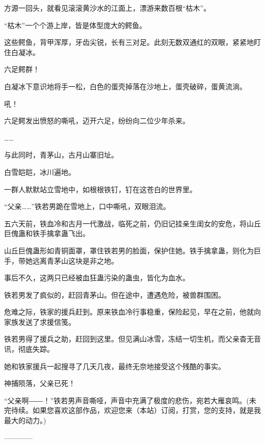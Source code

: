\begin{this_body}
方源一回头，就看见滚滚黄沙水的江面上，漂游来数百根“枯木”。

“枯木”一个个游上岸，皆是体型庞大的鳄鱼。

这些鳄鱼，背甲浑厚，牙齿尖锐，长有三对足。此刻无数双通红的双眼，紧紧地盯住白凝冰。

六足鳄群！

白凝冰下意识地将手一松，白色的蛋壳掉落在沙地上，蛋壳破碎，蛋黄流淌。

吼！

六足鳄发出愤怒的嘶吼，迈开六足，纷纷向二位少年杀来。

……

与此同时，青茅山，古月山寨旧址。

白雪皑皑，冰川遍地。

一群人默默站立雪地中，如根根铁钉，钉在这苍白的世界里。

“父亲……”铁若男跪在雪地上，口中嘶吼，双眼泪流。

五六天前，铁血冷和古月一代激战，临死之前，仍旧记挂亲生闺女的安危，将山丘巨傀蛊和铁手擒拿蛊飞出。

山丘巨傀蛊形如青铜面罩，罩住铁若男的脸面，保护住她。铁手擒拿蛊，则化为巨手，带她远离青茅山这块是非之地。

事后不久，这两只已经被血狂蛊污染的蛊虫，皆化为血水。

铁若男发了疯似的，赶回青茅山。但在途中，遭遇危险，被兽群围困。

危难之际，铁家的援兵赶到。原来铁血冷行事稳重，保险起见，早在之前，他就向家族发送了求援信笺。

铁若男得了援兵之助，赶回到这里。但见满山冰雪，冻结一切生机，而父亲杳无音讯，彻底失踪。

她和铁家援兵一起搜寻了几天几夜，最终无奈地接受这个残酷的事实。

神捕陨落，父亲已死！

“父亲啊――！”铁若男声音嘶哑，声音中充满了极度的悲伤，宛若大雁哀鸣。(未完待续。如果您喜欢这部作品，欢迎您来（本站）订阅，打赏，您的支持，就是我最大的动力。)

------------

\end{this_body}

